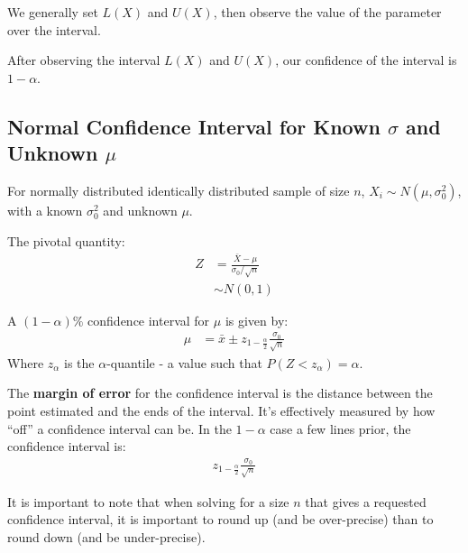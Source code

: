                     We generally set $L(X)$ and $U(X)$, then observe the value of the parameter over the interval.

                    After observing the interval $L(X)$ and $U(X)$, our confidence of the interval is $1-\alpha$.
                \subsection{Normal Confidence Interval for Known $\sigma$ and Unknown $\mu$} %
                \label{sub:normal_confidence_interval}
                    For normally distributed identically distributed sample of size $n$, $X_i \sim N(\mu, \sigma_0^2)$, with a known $\sigma_0^2$ and unknown $\mu$.

                    The pivotal quantity:
                    \begin{align*}
                        Z &= \frac{\bar{X} - \mu}{\sigma_0 / \sqrt{n}} \\
                        &\sim N(0, 1)
                    \end{align*}

                    A $(1-\alpha)\%$ confidence interval for $\mu$ is given by:
                    \begin{align*}
                        \mu &= \bar{x} \pm z_{1 - \frac{\alpha}{2}} \frac{\sigma_0}{\sqrt{n}}
                    \end{align*}
                    Where $z_\alpha$ is the $\alpha$-quantile - a value such that $P(Z < z_\alpha) = \alpha$.

                    The \textbf{margin of error} for the confidence interval is the distance between the point estimated and the ends of the interval.
                    It's effectively measured by how ``off'' a confidence interval can be.
                    In the $1-\alpha$ case a few lines prior, the confidence interval is:
                    \begin{align*}
                        z_{1 - \frac{\alpha}{2}} \frac{\sigma_0}{\sqrt{n}}
                    \end{align*}

                    It is important to note that when solving for a size $n$ that gives a requested confidence interval, it is important to round up (and be over-precise) than to round down (and be under-precise).

